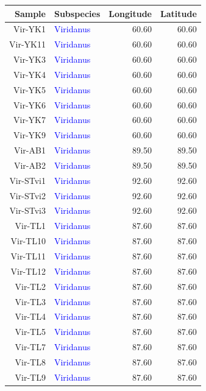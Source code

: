 \documentclass[10pt,letterpaper]{article}
\begin{document}
\begin{table}
\centering
\tiny
\begin{tabular}{rlrr}
  \hline
Sample & Subspecies & Longitude & Latitude \\ 
  \hline
 Vir-YK1 & \textcolor{blue}{Viridanus} & 60.60 & 60.60 \\ 
   Vir-YK11 & \textcolor{blue}{Viridanus} & 60.60 & 60.60 \\ 
   Vir-YK3 & \textcolor{blue}{Viridanus} & 60.60 & 60.60 \\ 
   Vir-YK4 & \textcolor{blue}{Viridanus} & 60.60 & 60.60 \\ 
   Vir-YK5 & \textcolor{blue}{Viridanus} & 60.60 & 60.60 \\ 
   Vir-YK6 & \textcolor{blue}{Viridanus} & 60.60 & 60.60 \\ 
   Vir-YK7 & \textcolor{blue}{Viridanus} & 60.60 & 60.60 \\ 
   Vir-YK9 & \textcolor{blue}{Viridanus} & 60.60 & 60.60 \\ 
   Vir-AB1 & \textcolor{blue}{Viridanus} & 89.50 & 89.50 \\ 
   Vir-AB2 & \textcolor{blue}{Viridanus} & 89.50 & 89.50 \\ 
  Vir-STvi1 & \textcolor{blue}{Viridanus} & 92.60 & 92.60 \\ 
  Vir-STvi2 & \textcolor{blue}{Viridanus} & 92.60 & 92.60 \\ 
  Vir-STvi3 & \textcolor{blue}{Viridanus} & 92.60 & 92.60 \\ 
   Vir-TL1 & \textcolor{blue}{Viridanus} & 87.60 & 87.60 \\ 
   Vir-TL10 & \textcolor{blue}{Viridanus} & 87.60 & 87.60 \\ 
   Vir-TL11 & \textcolor{blue}{Viridanus} & 87.60 & 87.60 \\ 
   Vir-TL12 & \textcolor{blue}{Viridanus} & 87.60 & 87.60 \\ 
   Vir-TL2 & \textcolor{blue}{Viridanus} & 87.60 & 87.60 \\ 
   Vir-TL3 & \textcolor{blue}{Viridanus} & 87.60 & 87.60 \\ 
   Vir-TL4 & \textcolor{blue}{Viridanus} & 87.60 & 87.60 \\ 
   Vir-TL5 & \textcolor{blue}{Viridanus} & 87.60 & 87.60 \\ 
   Vir-TL7 & \textcolor{blue}{Viridanus} & 87.60 & 87.60 \\ 
   Vir-TL8 & \textcolor{blue}{Viridanus} & 87.60 & 87.60 \\ 
   Vir-TL9 & \textcolor{blue}{Viridanus} & 87.60 & 87.60 \\ 

\end{tabular}
\end{table}
\end{document}
